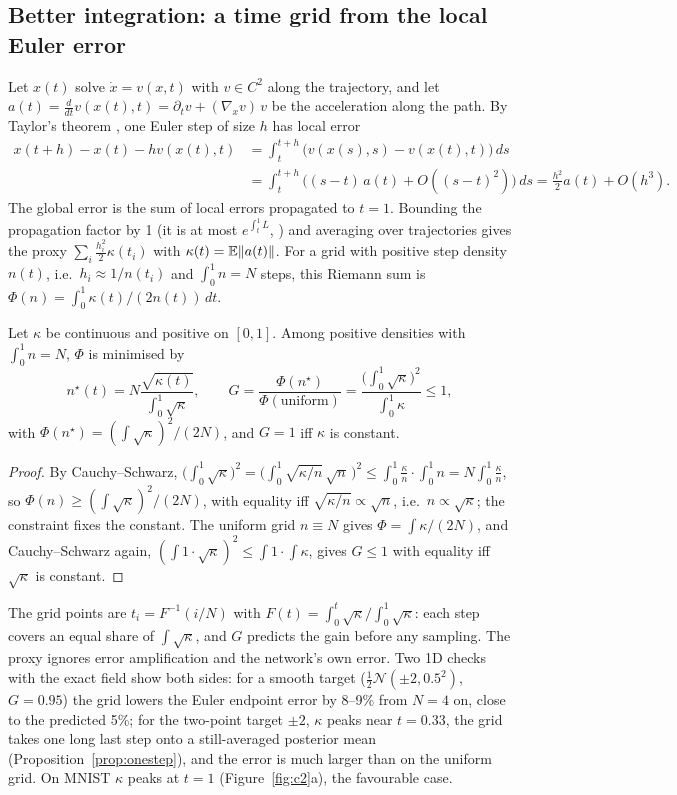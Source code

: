 \subsection{Better integration: a time grid from the local Euler error}\label{sec:grid}
Let $x(t)$ solve $\dot x=v(x,t)$ with $v\in C^2$ along the trajectory, and let $a(t)=\frac{d}{dt}v(x(t),t)=\partial_tv+(\nabla_xv)\,v$ be the acceleration along the path. By Taylor's theorem \citep[\S II.2]{hairer1993ode}, one Euler step of size $h$ has local error
\begin{align*}
x(t+h)-x(t)-hv(x(t),t)&=\int_t^{t+h}\big(v(x(s),s)-v(x(t),t)\big)\,ds\\
&=\int_t^{t+h}\big((s-t)\,a(t)+O((s-t)^2)\big)\,ds=\tfrac{h^2}{2}a(t)+O(h^3).
\end{align*}
The global error is the sum of local errors propagated to $t=1$. Bounding the propagation factor by 1 (it is at most $e^{\int_t^1L}$, \citealp[Thm.~I.10.2]{hairer1993ode}) and averaging over trajectories gives the proxy $\sum_i\frac{h_i^2}{2}\kappa(t_i)$ with $\kappa(t)=\mathbb{E}\|a(t)\|$. For a grid with positive step density $n(t)$, i.e.\ $h_i\approx1/n(t_i)$ and $\int_0^1n=N$ steps, this Riemann sum is $\Phi(n)=\int_0^1\kappa(t)/(2n(t))\,dt$.
\begin{proposition}\label{prop:grid}
Let $\kappa$ be continuous and positive on $[0,1]$. Among positive densities with $\int_0^1n=N$, $\Phi$ is minimised by
\begin{equation}\label{eq:sqrtk}
n^\star(t)=N\frac{\sqrt{\kappa(t)}}{\int_0^1\sqrt\kappa},\qquad
G=\frac{\Phi(n^\star)}{\Phi(\text{uniform})}=\frac{\big(\int_0^1\sqrt\kappa\big)^2}{\int_0^1\kappa}\le1 ,
\end{equation}
with $\Phi(n^\star)=(\int\sqrt\kappa)^2/(2N)$, and $G=1$ iff $\kappa$ is constant.
\end{proposition}
\begin{proof}
By Cauchy--Schwarz, $\big(\int_0^1\sqrt\kappa\big)^2=\big(\int_0^1\sqrt{\kappa/n}\,\sqrt n\,\big)^2\le\int_0^1\frac{\kappa}{n}\cdot\int_0^1n=N\int_0^1\frac{\kappa}{n}$, so $\Phi(n)\ge(\int\sqrt\kappa)^2/(2N)$, with equality iff $\sqrt{\kappa/n}\propto\sqrt n$, i.e.\ $n\propto\sqrt\kappa$; the constraint fixes the constant. The uniform grid $n\equiv N$ gives $\Phi=\int\kappa/(2N)$, and Cauchy--Schwarz again, $(\int1\cdot\sqrt\kappa)^2\le\int1\cdot\int\kappa$, gives $G\le1$ with equality iff $\sqrt\kappa$ is constant.
\end{proof}
The grid points are $t_i=F^{-1}(i/N)$ with $F(t)=\int_0^t\sqrt\kappa/\!\int_0^1\sqrt\kappa$: each step covers an equal share of $\int\sqrt\kappa$, and $G$ predicts the gain before any sampling. The proxy ignores error amplification and the network's own error. Two 1D checks with the exact field show both sides: for a smooth target ($\tfrac12\mathcal N(\pm2,0.5^2)$, $G=0.95$) the grid lowers the Euler endpoint error by 8--9\% from $N=4$ on, close to the predicted 5\%; for the two-point target $\pm2$, $\kappa$ peaks near $t=0.33$, the grid takes one long last step onto a still-averaged posterior mean (Proposition~\ref{prop:onestep}), and the error is much larger than on the uniform grid. On MNIST $\kappa$ peaks at $t=1$ (Figure~\ref{fig:c2}a), the favourable case.

